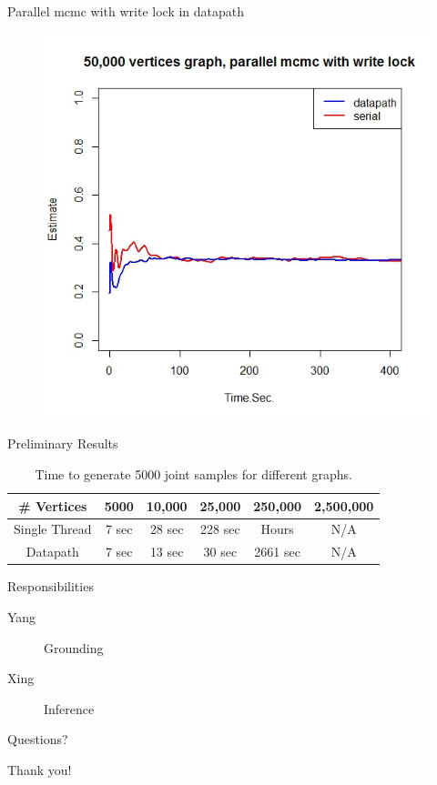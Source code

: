\documentclass[onlymath,xcolor=pdftex,dvipsnames,table]{beamer}
\begin{document}
\begin{frame}{Parallel mcmc with write lock in datapath}
\begin{figure}
  \centering
  \includegraphics[width=.6\textwidth]{R3.jpeg}
\end{figure}
\end{frame}


\begin{frame}{Preliminary Results}
\begin{table}[h]
  \centering
  \begin{tabular}{cccccc}\toprule
    \# Vertices & 5000	& 10,000 & 25,000 & 250,000 & 2,500,000\\\midrule
       Single Thread & 7 sec & 28 sec & 228 sec & Hours	& N/A\\
       Datapath & 7 sec & 13 sec & 30 sec & 2661 sec & N/A\\
     \bottomrule
  \end{tabular}
  \caption{Time to generate 5000 joint samples for different graphs.}
\end{table}
\end{frame}


\begin{frame}{Responsibilities}
\begin{description}
  \item[Yang] Grounding
  \item[Xing] Inference
\end{description}
\end{frame}


\begin{frame}{Questions?}
\begin{center}
  \LARGE Thank you!
\end{center}
\end{frame}
\end{document}
